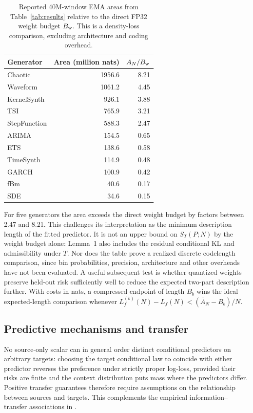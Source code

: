 \documentclass[10pt,a4paper]{article}
\theoremstyle{definition}
\begin{document}
\begin{table}[htbp]
\centering\small
\caption{Reported 40M-window EMA areas from Table~\ref{tab:results}
relative to the direct FP32 weight budget $B_{\rm w}$. This is a
density-loss comparison, excluding architecture and coding overhead.}
\label{tab:pt-direct}
\begin{tabular}{@{}lrr@{}}
\toprule
Generator & Area (million nats) & $A_N/B_{\rm w}$\\
\midrule
Chaotic & 1956.6 & 8.21\\
Waveform & 1061.2 & 4.45\\
KernelSynth & 926.1 & 3.88\\
TSI & 765.9 & 3.21\\
StepFunction & 588.3 & 2.47\\
\midrule
ARIMA & 154.5 & 0.65\\
ETS & 138.6 & 0.58\\
TimeSynth & 114.9 & 0.48\\
GARCH & 100.9 & 0.42\\
fBm & 40.6 & 0.17\\
SDE & 34.6 & 0.15\\
\bottomrule
\end{tabular}
\end{table}

For five generators the area exceeds the direct weight budget by
factors between 2.47 and 8.21. This challenges its interpretation as
the minimum description length of the fitted predictor. It is not
an upper bound on $S_T(P;N)$ by the weight budget alone: Lemma~1
also includes the residual conditional KL and admissibility under
$T$. Nor does the table prove a realized discrete codelength
comparison, since bin probabilities, precision, architecture and
other overheads have not been evaluated. A useful subsequent test
is whether quantized weights preserve held-out risk sufficiently
well to reduce the expected two-part description further. With
costs in nats, a compressed endpoint of length $B_b$ wins the
ideal expected-length comparison whenever
$L_f^{(b)}(N)-L_f(N)<(\overline A_N-B_b)/N$.

\subsection{Predictive mechanisms and transfer}
\label{sec:pt-transfer}

No source-only scalar can in general order distinct conditional
predictors on arbitrary targets: choosing the target conditional
law to coincide with either predictor reverses the preference under
strictly proper log-loss, provided their risks are finite and the
context distribution puts mass where the predictors differ.
Positive transfer guarantees therefore require assumptions on the
relationship between sources and targets. This complements the
empirical information--transfer associations in
\citet{finzi2026,su2026}.
\end{document}
